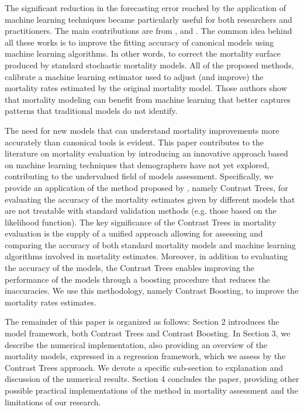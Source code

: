 \documentclass[fleqn,10pt]{wlscirep}
\begin{document}
The significant reduction in the forecasting error reached by the application of machine learning techniques became particularly useful for both researchers and practitioners. The main contributions are from \cite{Deprez}, \cite{LevPiz} and \cite{LevNi}. The common idea behind all these works is to improve the fitting accuracy of canonical models using machine learning algorithms. In other words, to correct the mortality surface produced by standard stochastic mortality models. All of the proposed methods, calibrate a machine learning estimator used to adjust (and improve) the mortality rates estimated by the original mortality model. Those authors show that mortality modeling can benefit from machine learning that better captures patterns that traditional models do not identify. 

The need for new models that can understand mortality improvements more accurately than canonical tools is evident. 
This paper contributes to the literature on mortality evaluation by introducing an innovative approach based on machine learning techniques that demographers have not yet explored, contributing to the undervalued field of models assessment. 
Specifically, we provide an application of the method proposed by \cite{Friedman2020}, namely Contrast Trees, for evaluating the accuracy of the mortality estimates given by different models that are not treatable with standard validation methods (e.g. those based on the likelihood function). 
The key significance of the Contrast Trees in mortality evaluation is the supply of a unified approach allowing for assessing and comparing the accuracy of both standard mortality models and machine learning algorithms involved in mortality estimates. Moreover, in addition to evaluating the accuracy of the models, the Contrast Trees enables improving the performance of the models through a boosting procedure that reduces the inaccuracies. We use this methodology, namely Contrast Boosting, to improve the mortality rates estimates. 

The remainder of this paper is organized as follows: Section 2 introduces the model framework, both Contrast Trees and Contrast Boosting. 
In Section 3, we describe the numerical implementation, also providing an overview of the mortality models, expressed in a regression framework, which we assess by the Contrast Trees approach. We devote a specific sub-section to explanation and discussion of the numerical results. 
Section 4 concludes the paper, providing other possible practical implementations of the method in mortality assessment and the limitations of our research.
\end{document}
